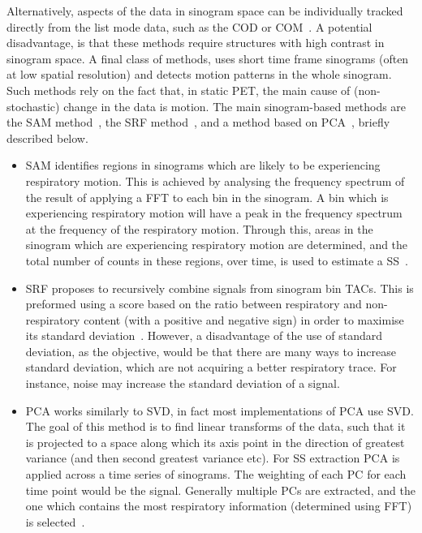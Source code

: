     Alternatively, aspects of the data in sinogram space can be individually tracked directly from the list mode data, such as the \gls{COD} or \gls{COM}~\parencite{Klein2001Fine-scaleInformation, Bruyant2002CorrectionPhantom, Ren2017Data-drivenDistribution, Feng2018Self-gating:PET}. A potential disadvantage, is that these methods require structures with high contrast in sinogram space. A final class of methods, uses short time frame sinograms (often at low spatial resolution) and detects motion patterns in the whole sinogram. Such methods rely on the fact that, in static \gls{PET}, the main cause of (non-stochastic) change in the data is motion. The main sinogram-based methods are the \gls{SAM} method~\parencite{Schleyer2009, Schleyer2011, Schleyer2018Data-DrivenMotion}, the \gls{SRF} method~\parencite{Kesner2010AMethods}, and a method based on \gls{PCA}~\parencite{Thielemans2011, Bertolli2018Data-DrivenTomography}, briefly described below.

    \begin{itemize}
        \item \gls{SAM} identifies regions in sinograms which are likely to be experiencing respiratory motion. This is achieved by analysing the frequency spectrum of the result of applying a \gls{FFT} to each bin in the sinogram. A bin which is experiencing respiratory motion will have a peak in the frequency spectrum at the frequency of the respiratory motion. Through this, areas in the sinogram which are experiencing respiratory motion are determined, and the total number of counts in these regions, over time, is used to estimate a \gls{SS}~\parencite{Schleyer2009, Schleyer2011, Schleyer2018Data-DrivenMotion}.

        \item \gls{SRF} proposes to recursively combine signals from sinogram bin \glspl{TAC}. This is preformed using a score based on the ratio between respiratory and non-respiratory content (with a positive and negative sign) in order to maximise its standard deviation~\parencite{Kesner2010AMethods}. However, a disadvantage of the use of standard deviation, as the objective, would be that there are many ways to increase standard deviation, which are not acquiring a better respiratory trace. For instance, noise may increase the standard deviation of a signal.

        \item \gls{PCA} works similarly to \gls{SVD}, in fact most implementations of \gls{PCA} use \gls{SVD}. The goal of this method is to find linear transforms of the data, such that it is projected to a space along which its axis point in the direction of greatest variance (and then second greatest variance etc). For \gls{SS} extraction \gls{PCA} is applied across a time series of sinograms. The weighting of each \gls{PC} for each time point would be the signal. Generally multiple \glspl{PC} are extracted, and the one which contains the most respiratory information (determined using \gls{FFT}) is selected~\parencite{Thielemans2011, Bertolli2018Data-DrivenTomography}.
    \end{itemize}
    
